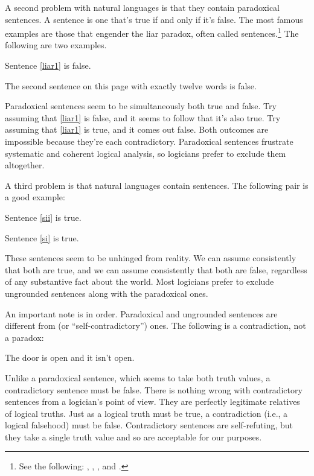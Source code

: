 A second problem with natural languages is that they contain paradoxical sentences. 
A  sentence is one that's true if and only if it's false. 
The most famous examples are those that engender the liar paradox, often called  sentences.\footnote{See the following: \citealt{Tarski1983,Tarski1944}, \citealp{Kripke1975}, \citealp{Barwise1987}, and \citealp{Gupta2001}.}
The following are two examples.
\begin{menumerate}
\item\label{liar1} Sentence \ref{liar1} is false.
\item\label{liar2} The second sentence on this page with exactly twelve words is false.
\end{menumerate}
Paradoxical sentences seem to be simultaneously both true and false. Try assuming that \ref{liar1} is false, and it seems to follow that it's also true. Try assuming that \ref{liar1} is true, and it comes out false.  Both outcomes are impossible because they're each contradictory. 
Paradoxical sentences frustrate systematic and coherent logical analysis, so logicians prefer to exclude them altogether.

A third problem is that natural languages contain  sentences. 
The following pair is a good example:
\begin{menumerate} 
\item\label{si} Sentence \ref{sii} is true.
\item\label{sii} Sentence \ref{si} is true.
\end{menumerate}
These sentences seem to be unhinged from reality. 
We can assume consistently that both are true, and we can assume consistently that both are false, regardless of any substantive fact about the world. 
Most logicians prefer to exclude ungrounded sentences along with the paradoxical ones.

An important note is in order. 
Paradoxical and ungrounded sentences are different from  (or ``self-contradictory'') ones. 
The following is a contradiction, not a paradox:
\begin{menumerate} 
	\item The door is open and it isn't open.
\end{menumerate}
Unlike a paradoxical sentence, which seems to take both truth values, a contradictory sentence must be false. 
There is nothing wrong with contradictory sentences from a logician's point of view. 
They are perfectly legitimate relatives of logical truths. 
Just as a logical truth must be true, a contradiction (i.e., a logical falsehood) must be false. 
Contradictory sentences are self-refuting, but they take a single truth value and so are acceptable for our purposes. 

